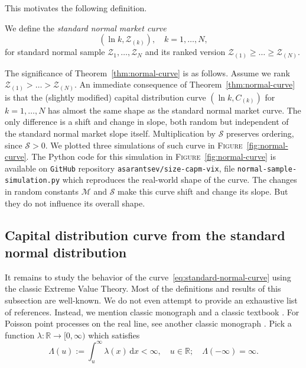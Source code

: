 \documentclass[12pt]{amsart}
\begin{document}
This motivates the following definition. 

\begin{defn} We define the {\it standard normal market curve} 
\begin{equation}
\label{eq:standard-normal-curve}
(\ln k, \mathcal Z_{(k)}),\quad k = 1,\ldots, N,
\end{equation}
for standard normal sample $\mathcal Z_1, \ldots, \mathcal Z_N$ and its ranked version $\mathcal Z_{(1)} \ge \ldots \ge \mathcal Z_{(N)}$.
\end{defn}

The significance of Theorem~\ref{thm:normal-curve} is as follows. Assume we rank $\mathcal Z_{(1)} > \ldots > \mathcal Z_{(N)}$. An immediate consequence of Theorem~\ref{thm:normal-curve} is that the (slightly modified) capital distribution curve $(\ln k, C_{(k)})$ for $k = 1, \ldots, N$ has almost the same shape as the standard normal market curve. The only difference is a shift and change in slope, both random but independent of the standard normal market slope itself. Multiplication by $\mathcal S$ preserves ordering, since $\mathcal S > 0$. We plotted three simulations of such curve in \textsc{Figure}~\ref{fig:normal-curve}. The Python code for this simulation in \textsc{Figure}~\ref{fig:normal-curve} is available on \texttt{GitHub} repository \texttt{asarantsev/size-capm-vix}, file \texttt{normal-sample-simulation.py} which reproduces the real-world shape of the curve. The changes in random constants $\mathcal M$ and $\mathcal S$ make this curve shift and change its slope. But they do not influence its overall shape. 

\subsection{Capital distribution curve from the standard normal distribution} It remains to study the behavior of the curve~\eqref{eq:standard-normal-curve} using the classic Extreme Value Theory. Most of the definitions and results of this subsection are well-known. We do not even attempt to provide an exhaustive list of references. Instead, we mention classic monograph \cite{Resnick-Book} and a classic textbook \cite{Extreme-Book}. For Poisson point processes on the real line, see another classic monograph \cite{Kingman}. Pick a function $\lambda : \mathbb R \to [0, \infty)$ which satisfies 
$$
\Lambda(u) := \int_{u}^{\infty}\lambda(x)\,\mathrm{d}x < \infty,\quad u \in \mathbb R;\quad \Lambda(-\infty) = \infty.
$$
\end{document}

